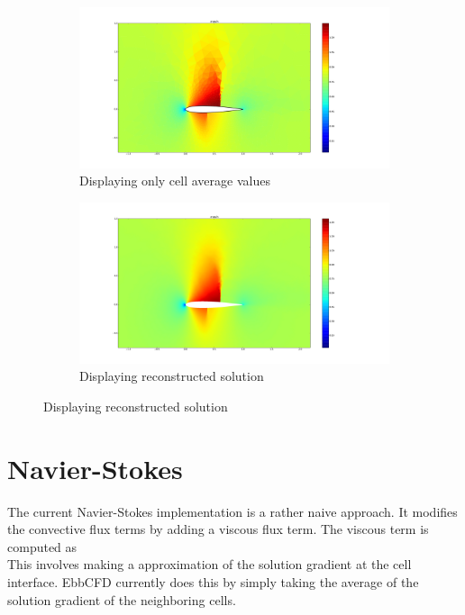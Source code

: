 \documentclass[12pt,parskip=full]{article}
\numberwithin{subsection}{section}
\begin{document}
		\begin{figure}[H]
			\centering
			\begin{subfigure}{0.4\textwidth}
				\hspace*{-2cm}\includegraphics[scale=0.2,trim={7cm 2cm 10cm 2cm},clip]{CellAvgPlot.pdf}
				\hspace*{-2cm}\caption{Displaying only cell average values}
			\end{subfigure}
			\begin{subfigure}{0.4\textwidth}
				\hspace*{1cm}\includegraphics[scale=0.2,trim={7cm 2cm 10cm 2cm},clip]{ReconstructedPlot.pdf}
				\hspace*{1cm}\caption{Displaying reconstructed solution}
			\end{subfigure}
		\end{figure}
		
	\section{Navier-Stokes}
		The current Navier-Stokes implementation is a rather naive approach. It modifies the convective flux terms by adding a
		viscous flux term. The viscous term is computed as
		\begin{equation}
		\end{equation}
		This involves making a approximation of the solution gradient at the cell interface. EbbCFD currently does this by simply
		taking the average of the solution gradient of the neighboring cells.
		
\end{document}
